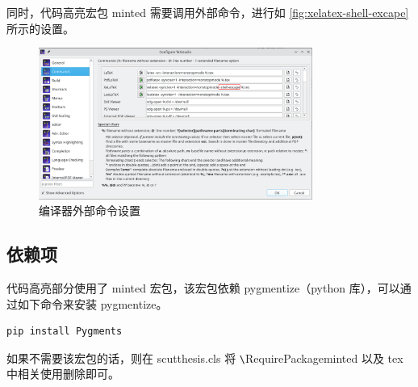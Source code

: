 同时，代码高亮宏包 minted 需要调用外部命令，进行如 \autoref{fig:xelatex-shell-excape} 所示的设置。

\begin{figure}[H]
    \centering
    \includegraphics[width=0.8\textwidth]{img/xelatex-shell-escape.png}
    \caption{编译器外部命令设置}
    \label{fig:xelatex-shell-excape}
\end{figure}

\subsection{依赖项}

代码高亮部分使用了 minted 宏包，该宏包依赖 pygmentize（python 库），可以通过如下命令来安装 pygmentize。

\begin{verbatim}
pip install Pygments
\end{verbatim}

如果不需要该宏包的话，则在 scutthesis.cls 将 \verb|\|RequirePackage{minted} 以及 tex 中相关使用删除即可。
